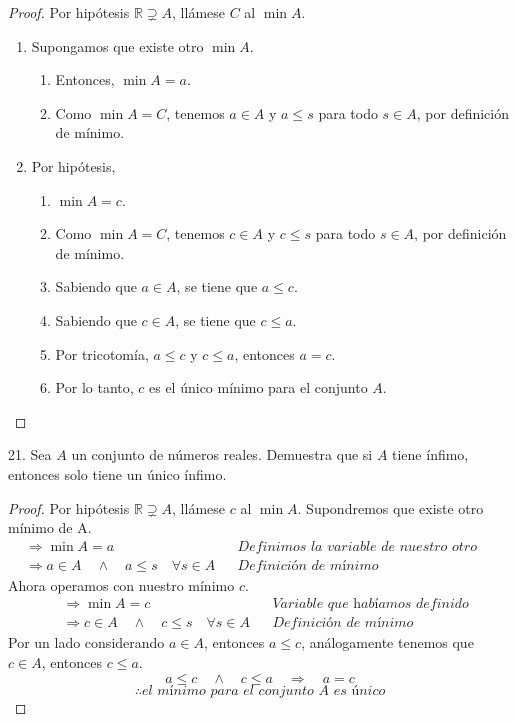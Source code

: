 \documentclass{article}
\begin{document}
  \begin{proof}
Por hipótesis $\mathbb{R} \supsetneq A$, llámese $C$ al $\min A$.
\begin{enumerate}
    \item Supongamos que existe otro $\min A$.
    \begin{enumerate}
        \item Entonces, $\min A = a$.
        \item Como $\min A = C$, tenemos $a \in A$ y $a \leq s$ para todo $s \in A$, por definición de mínimo.
    \end{enumerate}
    \item Por hipótesis,
    \begin{enumerate}
        \item $\min A = c$.
        \item Como $\min A = C$, tenemos $c \in A$ y $c \leq s$ para todo $s \in A$, por definición de mínimo.
    \item Sabiendo que $a \in A$, se tiene que $a \leq c$.
    \item Sabiendo que $c \in A$, se tiene que $c \leq a$.
    \item Por tricotomía, $a \leq c$ y $c \leq a$, entonces $a = c$.
    \item Por lo tanto, $c$ es el único mínimo para el conjunto $A$.
\end{enumerate}
\end{enumerate}
\end{proof}

  
  21. Sea \(A\) un conjunto de números reales. Demuestra que si \(A\) tiene ínfimo, entonces solo tiene un único ínfimo. \\
  \begin{proof}
      Por hipótesis $\mathbb{R} \supsetneq A$, llámese $c$ al $\min A$. Supondremos que existe otro mínimo de A.
      \begin{align*}
    &\Rightarrow \min A = a && \textit{Definimos la variable de nuestro otro mínimo} \\
    &\Rightarrow a \in A \quad \land \quad a \leq s \quad \forall s \in A && \textit{Definición de mínimo}
      \end{align*}
      Ahora operamos con nuestro mínimo $c$.
\begin{align*}
    &\Rightarrow \min A = c && \textit{Variable que habíamos definido}\\
    &\Rightarrow c \in A \quad \land \quad c \leq s \quad \forall s \in A && \textit{Definición de mínimo}
      \end{align*}
      Por un lado considerando $a \in A$, entonces $a \leq c$, análogamente tenemos que $c \in A$, entonces $c \leq a$.
      \[ a \leq c \quad \land \quad c \leq a \quad \Rightarrow \quad a=c \]
      \[ \therefore \textit{el mínimo para el conjunto A es único}\]
  \end{proof}
\end{document}
